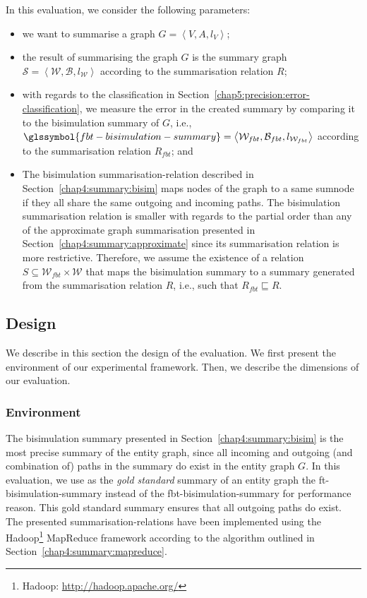 In this evaluation, we consider the following parameters:
\begin{itemize}
	\item we want to summarise a graph $G=\left\langle V, A, l_V \right\rangle$;
	\item the result of summarising the graph $G$ is the summary graph $\mathcal{S} = \left\langle \mathcal{W}, \mathcal{B}, l_{\mathcal{W}} \right\rangle$ according to the summarisation relation $R$;
	\item with regards to the classification in Section~\ref{chap5:precision:error-classification}, we measure the error in the created summary by comparing it to the bisimulation summary  of $G$, i.e., $\glssymbol{fbt-bisimulation-summary} = \left\langle \mathcal{W}_{fbt}, \mathcal{B}_{fbt}, l_{\mathcal{W}_{fbt}} \right\rangle$ according to the summarisation relation $R_{fbt}$; and
	\item The bisimulation \gls{summarisation-relation} described in Section~\ref{chap4:summary:bisim} maps nodes of the graph to a same sumnode if they all share the same outgoing and incoming paths. The bisimulation summarisation relation is smaller with regards to the partial order  than any of the approximate graph summarisation presented in Section~\ref{chap4:summary:approximate} since its summarisation relation is more restrictive. Therefore, we assume the existence of a relation $S \subseteq \mathcal{W}_{fbt} \times \mathcal{W}$ that maps the bisimulation summary to a summary generated from the summarisation relation $R$, i.e., such that $R_{fbt} \sqsubseteq R$.
\end{itemize}

\subsection{Design}
\label{chap5:precision:eval:design}

We describe in this section the design of the evaluation. We first present the environment of our experimental framework. Then, we describe the dimensions of our evaluation.

\subsubsection{Environment}

The bisimulation summary  presented in Section~\ref{chap4:summary:bisim} is the most precise summary of the entity graph, since all incoming and outgoing (and combination of) paths in the summary do exist in the entity graph $G$. In this evaluation, we use as the \emph{gold standard} summary of an entity graph the \gls{ft-bisimulation-summary} instead of the \gls{fbt-bisimulation-summary} for performance reason. This gold standard summary ensures that all outgoing paths do exist. The presented \glspl{summarisation-relation} have been implemented using the Hadoop\footnote{Hadoop: \url{http://hadoop.apache.org/}} MapReduce framework according to the algorithm outlined in Section~\ref{chap4:summary:mapreduce}.

